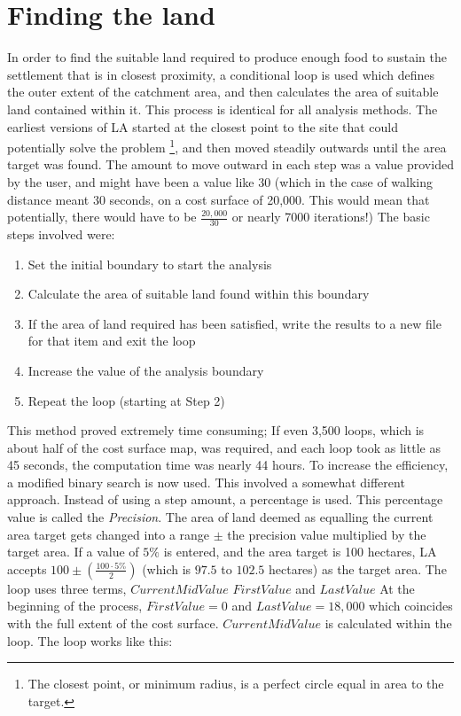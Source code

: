 \section{Finding the land} 

In order to find the suitable land required
to produce enough food to sustain the settlement that is in closest proximity, 
a conditional loop is used which defines the outer extent of the catchment
area, 
and then calculates the area of suitable land contained within it.  This process
is identical for all
analysis methods.  The earliest versions of LA started at the
closest point to the site that could potentially solve the problem
\footnote{The closest point, or minimum radius, is a perfect circle equal in
area to the target.}, and then moved steadily outwards until the area target
was found.  The amount to move outward in each step was a value provided by the
user, and might have been a value like 30 (which in the case of walking
distance meant 30 seconds, on  a cost surface of 20,000.  This would mean that
potentially, there would have to be $\frac{20,000}{30}$ or nearly 7000
iterations!)
The basic steps involved were:

   \begin{enumerate} 
   
   \item  Set the initial boundary to start the analysis
   
   \item  Calculate the area of suitable land found within this boundary 
   
   \item If the area of land required has been satisfied, write the results to a
new
   file for that item and exit the loop 
   
   \item  Increase the value of the analysis boundary 
   
   \item  Repeat the loop (starting at Step 2)
   
   \end{enumerate}

This method proved extremely time consuming;  If even 3,500 loops, which is
about half of the cost surface map, was required, and each loop took as little
as 45 seconds, the computation time was nearly 44 hours.   To increase the
efficiency, a modified binary search is now used.  This involved a somewhat
different approach.  Instead of using a step amount, a percentage is used.
This percentage value is called the \textit{Precision}. 
The area of land deemed as equalling the current area target gets changed into
a range $\pm$ the precision value multiplied by the target area. 
If a value of $5\%$ is entered, and the area
target is 100 hectares, LA accepts $100 \pm(\frac{100 \cdot
5\%}{2})$ (which is $97.5$ to $102.5$ hectares) as the target area.  The loop
uses three terms, $CurrentMidValue$ $FirstValue$ and $LastValue$ At the
beginning of the process, $FirstValue=0$ and $LastValue=18,000$ which coincides
with the full extent of the cost surface.  $CurrentMidValue$ is calculated
within the loop.  The loop works like this:

